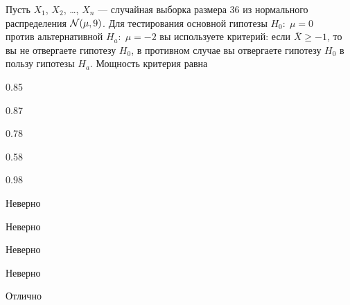 
\begin{question}
Пусть \(X_1\), \(X_2\), \ldots, \(X_n\) — случайная выборка размера 36
из нормального распределения \(\mathcal{N}(\mu, 9)\). Для тестирования основной
гипотезы \(H_0: \; \mu=0\)\\
против альтернативной \(H_a: \; \mu=-2\) вы используете критерий: если
\(\bar{X}\geq -1\), то вы не отвергаете гипотезу \(H_0\), в противном
случае вы отвергаете гипотезу \(H_0\) в пользу гипотезы \(H_a\).
Мощность критерия равна
\begin{answerlist}
  \item 0.85
  \item 0.87
  \item 0.78
  \item 0.58
  \item 0.98
\end{answerlist}
\end{question}

\begin{solution}
\begin{answerlist}
  \item Неверно
  \item Неверно
  \item Неверно
  \item Неверно
  \item Отлично
\end{answerlist}
\end{solution}

